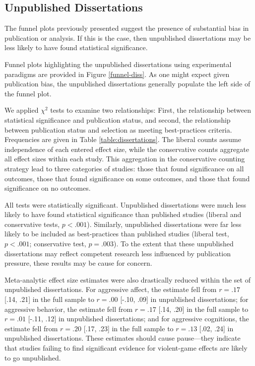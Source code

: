 \documentclass[man, mask]{apa6}
\begin{document}
\subsection{Unpublished Dissertations}
The funnel plots previously presented suggest the presence of substantial bias in publication or analysis. If this is the case, then unpublished dissertations may be less likely to have found statistical significance. 

Funnel plots highlighting the unpublished dissertations using experimental paradigms are provided in Figure \ref{funnel-diss}. As one might expect given publication bias, the unpublished dissertations generally populate the left side of the funnel plot. 

We applied $\chi^2$ tests to examine two relationships: First, the relationship between statistical significance and publication status, and second, the relationship between publication status and selection as meeting best-practices criteria. Frequencies are given in Table \ref{table:dissertations}. The liberal counts assume independence of each entered effect size, while the conservative counts aggregate all effect sizes within each study. This aggregation in the conservative counting strategy lead to three categories of studies: those that found significance on all outcomes, those that found significance on some outcomes, and those that found significance on no outcomes.

All tests were statistically significant. Unpublished dissertations were much less likely to have found statistical significance than published studies (liberal and conservative tests, $p < .001$).
Similarly, unpublished dissertations were far less likely to be included as best-practices than published studies (liberal test, $p < .001$; conservative test, $p = .003$). 
To the extent that these unpublished dissertations may reflect competent research less influenced by publication pressure, these results may be cause for concern.

Meta-analytic effect size estimates were also drastically reduced within the set of unpublished dissertations. For aggressive affect, the estimate fell from $r = .17$ [.14, .21] in the full sample to $r = .00$ [-.10, .09] in unpublished dissertations; for aggressive behavior, the estimate fell from $r = .17$ [.14, .20] in the full sample to $r = .01$ [-.11, .12] in unpublished dissertations; and for aggressive cognitions, the estimate fell from $r = .20$ [.17, .23] in the full sample to $r =  .13$ [.02, .24] in unpublished dissertations.  These estimates should cause pause---they indicate that studies failing to find significant evidence for violent-game effects are likely to go unpublished.
\end{document}
